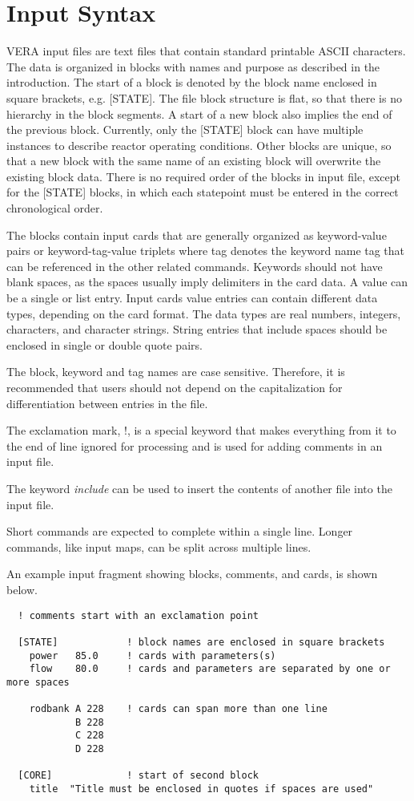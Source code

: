\documentclass{report}
\numberwithin{equation}{section}
\begin{document}
\section{Input Syntax}

VERA input files are text files that contain standard printable ASCII characters.
The data is organized in blocks with names and purpose as described in the
introduction. The start of a block is denoted by the block name enclosed in
square brackets, e.g. [STATE]. The file block structure is flat, so that there is
no hierarchy in the block segments. A start of a new block also implies the end of
the previous block. Currently, only the [STATE] block can have multiple instances
to describe reactor operating conditions. Other blocks are unique, so that a new
block with the same name of an existing block will overwrite the existing block data.
There is no required order of the blocks in input file, except for the [STATE] blocks,
in which each statepoint must be entered in the correct chronological order.

The blocks contain input cards that are generally organized as keyword-value pairs
or keyword-tag-value triplets where tag denotes the keyword name tag that can be
referenced in the other related commands. Keywords should not have blank spaces,
as the spaces usually imply delimiters in the card data.  A value can be a single
or list entry.
Input cards value entries can contain different data types, depending on the card format.
The data types are real numbers, integers, characters, and character strings.
String entries that include spaces should be enclosed in
single or double quote pairs.

The block, keyword and tag names are case sensitive.  Therefore, it is recommended
that users should not depend on the capitalization for differentiation between
entries in the file.

The exclamation mark, !,  is a special keyword that makes everything from it to the
end of line ignored for processing and is used for adding comments in an input file.

The keyword {\it include} can be used to insert the contents of another file into the input file.

Short commands are expected to complete within a single line. Longer commands, like input maps,
can be split across multiple lines.

An example input fragment showing blocks, comments, and cards, is shown below.
\begin{verbatim}
  ! comments start with an exclamation point

  [STATE]            ! block names are enclosed in square brackets
    power   85.0     ! cards with parameters(s)
    flow    80.0     ! cards and parameters are separated by one or more spaces

    rodbank A 228    ! cards can span more than one line
            B 228
            C 228
            D 228

  [CORE]             ! start of second block
    title  "Title must be enclosed in quotes if spaces are used"

\end{verbatim}
\end{document}
